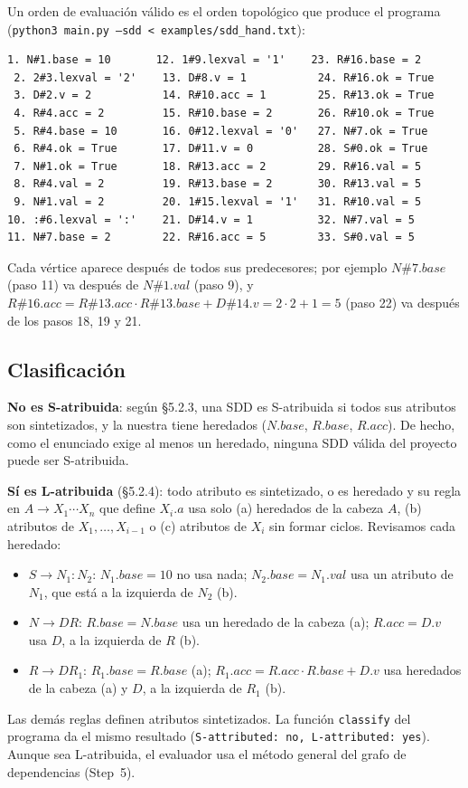 \documentclass[11pt,a4paper]{article}
\newcommand{\code}[1]{\texttt{#1}}
\begin{document}
Un orden de evaluación válido es el orden topológico que produce el programa
(\code{python3 main.py --sdd < examples/sdd\_hand.txt}):
\begin{Verbatim}[fontsize=\footnotesize]
 1. N#1.base = 10       12. 1#9.lexval = '1'    23. R#16.base = 2
 2. 2#3.lexval = '2'    13. D#8.v = 1           24. R#16.ok = True
 3. D#2.v = 2           14. R#10.acc = 1        25. R#13.ok = True
 4. R#4.acc = 2         15. R#10.base = 2       26. R#10.ok = True
 5. R#4.base = 10       16. 0#12.lexval = '0'   27. N#7.ok = True
 6. R#4.ok = True       17. D#11.v = 0          28. S#0.ok = True
 7. N#1.ok = True       18. R#13.acc = 2        29. R#16.val = 5
 8. R#4.val = 2         19. R#13.base = 2       30. R#13.val = 5
 9. N#1.val = 2         20. 1#15.lexval = '1'   31. R#10.val = 5
10. :#6.lexval = ':'    21. D#14.v = 1          32. N#7.val = 5
11. N#7.base = 2        22. R#16.acc = 5        33. S#0.val = 5
\end{Verbatim}
Cada vértice aparece después de todos sus predecesores; por ejemplo $N\#7.base$ (paso 11) va
después de $N\#1.val$ (paso 9), y $R\#16.acc = R\#13.acc\cdot R\#13.base + D\#14.v = 2\cdot 2+1
= 5$ (paso 22) va después de los pasos 18, 19 y 21.

\subsection{Clasificación}\label{sec:clasif}
\textbf{No es S-atribuida}: según §5.2.3, una SDD es S-atribuida si todos sus atributos son
sintetizados, y la nuestra tiene heredados ($N.base$, $R.base$, $R.acc$). De hecho, como el
enunciado exige al menos un heredado, ninguna SDD válida del proyecto puede ser S-atribuida.

\textbf{Sí es L-atribuida} (§5.2.4): todo atributo es sintetizado, o es heredado y su regla en
$A \to X_1\cdots X_n$ que define $X_i.a$ usa solo (a) heredados de la cabeza $A$, (b) atributos
de $X_1,\dots,X_{i-1}$ o (c) atributos de $X_i$ sin formar ciclos. Revisamos cada heredado:
\begin{itemize}
\item $S \to N_1 : N_2$: $N_1.base = 10$ no usa nada; $N_2.base = N_1.val$ usa un atributo de
$N_1$, que está a la izquierda de $N_2$ (b).
\item $N \to DR$: $R.base = N.base$ usa un heredado de la cabeza (a); $R.acc = D.v$ usa $D$, a la
izquierda de $R$ (b).
\item $R \to DR_1$: $R_1.base = R.base$ (a); $R_1.acc = R.acc\cdot R.base + D.v$ usa heredados de
la cabeza (a) y $D$, a la izquierda de $R_1$ (b).
\end{itemize}
Las demás reglas definen atributos sintetizados. La función \code{classify} del programa da el
mismo resultado (\code{S-attributed: no, L-attributed: yes}). Aunque sea L-atribuida, el
evaluador usa el método general del grafo de dependencias (Step~5).
\end{document}
